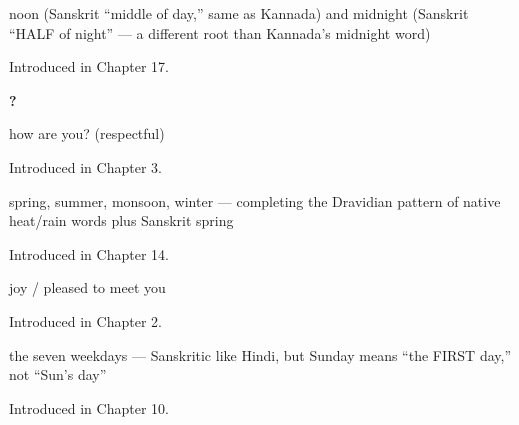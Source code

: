 \noindent\begin{minipage}[t]{\linewidth}
\raggedright
\textbf{ }\par
\small noon (Sanskrit \textquotedblleft{}middle of day,\textquotedblright{} same as Kannada) and midnight (Sanskrit \textquotedblleft{}HALF of night\textquotedblright{} — a different root than Kannada's midnight word)\par
\footnotesize Introduced in Chapter 17.
\end{minipage}\par\medskip

\noindent\begin{minipage}[t]{\linewidth}
\raggedright
\textbf{  ?}\par
\small how are you? (respectful)\par
\footnotesize Introduced in Chapter 3.
\end{minipage}\par\medskip

\noindent\begin{minipage}[t]{\linewidth}
\raggedright
\textbf{    }\par
\small spring, summer, monsoon, winter — completing the Dravidian pattern of native heat/rain words plus Sanskrit spring\par
\footnotesize Introduced in Chapter 14.
\end{minipage}\par\medskip

\noindent\begin{minipage}[t]{\linewidth}
\raggedright
\textbf{}\par
\small joy / pleased to meet you\par
\footnotesize Introduced in Chapter 2.
\end{minipage}\par\medskip

\noindent\begin{minipage}[t]{\linewidth}
\raggedright
\textbf{      }\par
\small the seven weekdays — Sanskritic like Hindi, but Sunday means \textquotedblleft{}the FIRST day,\textquotedblright{} not \textquotedblleft{}Sun's day\textquotedblright{}\par
\footnotesize Introduced in Chapter 10.
\end{minipage}\par\medskip
